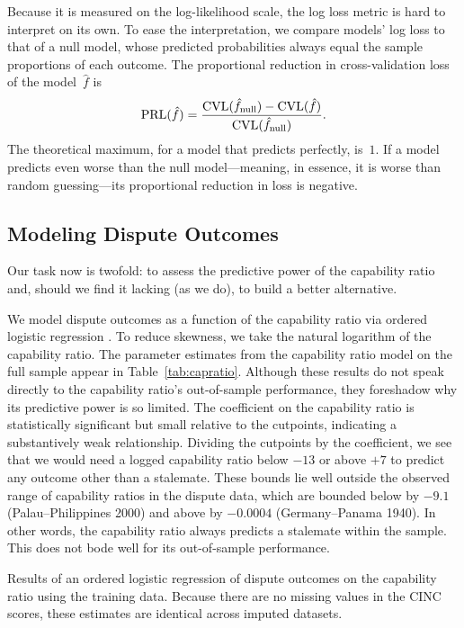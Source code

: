 Because it is measured on the log-likelihood scale, the log loss metric is hard to interpret on its own.
To ease the interpretation, we compare models' log loss to that of a null model, whose predicted probabilities always equal the sample proportions of each outcome.
The proportional reduction in cross-validation loss of the model~$\hat{f}$ is
\begin{equation}
  \label{eq:prl}
  \operatorname{PRL}(\hat{f})
  =
  \frac{
    \operatorname{CVL}(\hat{f}_{\text{null}}) - \operatorname{CVL}(\hat{f})
  }{
    \operatorname{CVL}(\hat{f}_{\text{null}})
  }.
\end{equation}
The theoretical maximum, for a model that predicts perfectly, is~$1$.
If a model predicts even worse than the null model---meaning, in essence, it is worse than random guessing---its proportional reduction in loss is negative.

\subsection{Modeling Dispute Outcomes}

Our task now is twofold: to assess the predictive power of the capability ratio and, should we find it lacking (as we do), to build a better alternative.

We model dispute outcomes as a function of the capability ratio via ordered logistic regression \citep{McKelvey:2010gv}.
To reduce skewness, we take the natural logarithm of the capability ratio.
The parameter estimates from the capability ratio model on the full sample appear in Table~\ref{tab:capratio}.
Although these results do not speak directly to the capability ratio's out-of-sample performance, they foreshadow why its predictive power is so limited.
The coefficient on the capability ratio is statistically significant but small relative to the cutpoints, indicating a substantively weak relationship.
Dividing the cutpoints by the coefficient, we see that we would need a logged capability ratio below $-13$ or above $+7$ to predict any outcome other than a stalemate.
These bounds lie well outside the observed range of capability ratios in the dispute data, which are bounded below by $-9.1$ (Palau--Philippines 2000) and above by $-0.0004$ (Germany--Panama 1940).
In other words, the capability ratio always predicts a stalemate within the sample.
This does not bode well for its out-of-sample performance.

\begin{table}[tp]
  \centering
  
  \caption{
    Results of an ordered logistic regression of dispute outcomes on the capability ratio using the training data.
    Because there are no missing values in the CINC scores, these estimates are identical across imputed datasets.
  }
  \label{tab:capratio}
\end{table}

